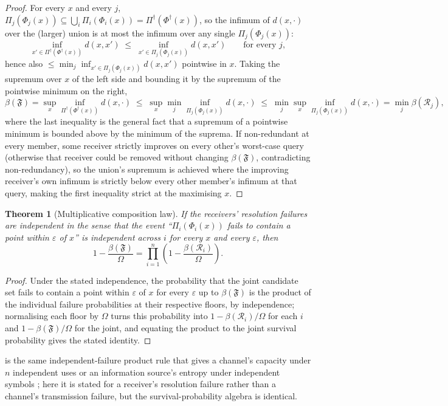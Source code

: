 \documentclass[11pt,twocolumn,a4paper]{article}
\theoremstyle{rdm}
\newtheorem{theorem}{Theorem}[section]
\theoremstyle{definition}
\theoremstyle{remark}
\newcommand{\flo}{\beta}
\newcommand{\Om}{\Omega}
\newcommand{\Rec}{\mathcal{R}}
\newcommand{\Fed}{\mathfrak{F}}
\newcommand{\eps}{\varepsilon}
\begin{document}
\begin{proof}
For every $x$ and every $j$, $\Pi_j(\Phi_j(x)) \subseteq
\bigcup_i\Pi_i(\Phi_i(x)) = \Pi^\dagger(\Phi^\dagger(x))$, so the infimum of
$d(x,\cdot)$ over the (larger) union is at most the infimum over any single
$\Pi_j(\Phi_j(x))$:
\[
\inf_{x'\in\Pi^\dagger(\Phi^\dagger(x))} d(x,x') \;\le\;
\inf_{x'\in\Pi_j(\Phi_j(x))} d(x,x') \qquad\text{for every }j,
\]
hence also $\le \min_j \inf_{x'\in\Pi_j(\Phi_j(x))}d(x,x')$ pointwise in
$x$. Taking the supremum over $x$ of the left side and bounding it by the
supremum of the pointwise minimum on the right,
\[
\flo(\Fed) = \sup_x \inf_{\Pi^\dagger(\Phi^\dagger(x))} d(x,\cdot)
\;\le\; \sup_x \min_j \inf_{\Pi_j(\Phi_j(x))} d(x,\cdot)
\;\le\; \min_j \sup_x \inf_{\Pi_j(\Phi_j(x))} d(x,\cdot) = \min_j\flo(\Rec_j),
\]
where the last inequality is the general fact that a supremum of a
pointwise minimum is bounded above by the minimum of the suprema. If
non-redundant at every member, some receiver strictly improves on every
other's worst-case query (otherwise that receiver could be removed without
changing $\flo(\Fed)$, contradicting non-redundancy), so the union's
supremum is achieved where the improving receiver's own infimum is
strictly below every other member's infimum at that query, making the
first inequality strict at the maximising $x$.
\end{proof}

\begin{theorem}[Multiplicative composition law]
\label{thm:mult-law}
If the receivers' resolution failures are independent in the sense that the
event ``$\Pi_i(\Phi_i(x))$ fails to contain a point within $\eps$ of $x$'' is
independent across $i$ for every $x$ and every $\eps$, then
\[
1 - \frac{\flo(\Fed)}{\Om} = \prod_{i=1}^n \left(1 - \frac{\flo(\Rec_i)}{\Om}\right).
\]
\end{theorem}

\begin{proof}
Under the stated independence, the probability that the joint candidate set
fails to contain a point within $\eps$ of $x$ for every $\eps$ up to
$\flo(\Fed)$ is the product of the individual failure probabilities at their
respective floors, by independence; normalising each floor by $\Om$ turns
this probability into $1-\flo(\Rec_i)/\Om$ for each $i$ and
$1-\flo(\Fed)/\Om$ for the joint, and equating the product to the joint
survival probability gives the stated identity.
\end{proof}

 is the same independent-failure product rule that gives
a channel's capacity under $n$ independent uses \citep{shannon1948,kelly1956}
or an information source's entropy under independent symbols
\citep{cover2006}; here it is stated for a receiver's resolution failure
rather than a channel's transmission failure, but the survival-probability
algebra is identical.
\end{document}

